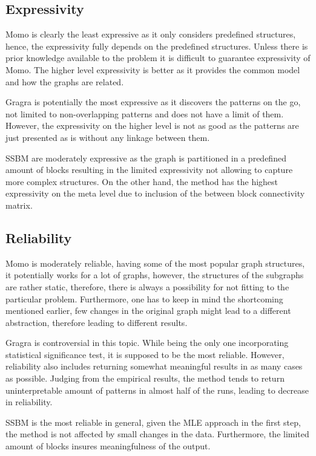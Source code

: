 \documentclass{article}
\begin{document}
\subsection{Expressivity}
Momo \citep{coupette2021momo} is clearly the least expressive as it only considers predefined structures, hence, the expressivity fully depends on the predefined structures. Unless there is prior knowledge available to the problem it is difficult to guarantee expressivity of Momo. The higher level expressivity is better as it provides the common model and how the graphs are related.

Gragra is potentially the most expressive as it discovers the patterns on the go, not limited to non-overlapping patterns and does not have a limit of them. However, the expressivity on the higher level is not as good as the patterns are just presented as is without any linkage between them.

SSBM are moderately expressive as the graph is partitioned in a predefined amount of blocks resulting in the limited expressivity not allowing to capture more complex structures. On the other hand, the method has the highest expressivity on the meta level due to inclusion of the between block connectivity matrix. 
    
\subsection{Reliability}
Momo is moderately reliable, having some of the most popular graph structures, it potentially works for a lot of graphs, however, the structures of the subgraphs are rather static, therefore, there is always a possibility for not fitting to the particular problem. Furthermore, one has to keep in mind the shortcoming mentioned earlier, few changes in the original graph might lead to a different abstraction, therefore leading to different results.

Gragra is controversial in this topic. While being the only one incorporating statistical significance test, it is supposed to be the most reliable. However, reliability also includes returning somewhat meaningful results in as many cases as possible. Judging from the empirical results, the method tends to return uninterpretable amount of patterns in almost half of the runs, leading to decrease in reliability.


SSBM is the most reliable in general, given the MLE approach in the first step, the method is not affected by small changes in the data. Furthermore, the limited amount of blocks insures meaningfulness of the output.
\end{document}
